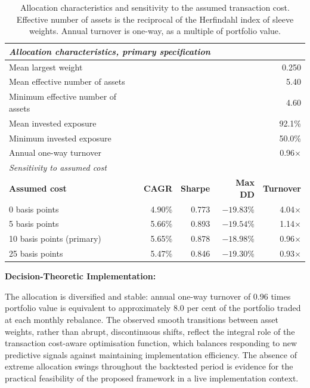 \begin{table}[!ht]
\centering
\caption{Allocation characteristics and sensitivity to the assumed transaction cost.
Effective number of assets is the reciprocal of the Herfindahl index of sleeve weights.
Annual turnover is one-way, as a multiple of portfolio value.}
\label{tab:turnover}
\footnotesize
\begin{tabular}{p{4.8cm}rrrr}
\hline
\multicolumn{5}{l}{\textit{Allocation characteristics, primary specification}} \\
\hline
Mean largest weight & \multicolumn{4}{r}{0.250} \\
Mean effective number of assets & \multicolumn{4}{r}{5.40} \\
Minimum effective number of assets & \multicolumn{4}{r}{4.60} \\
Mean invested exposure & \multicolumn{4}{r}{92.1\%} \\
Minimum invested exposure & \multicolumn{4}{r}{50.0\%} \\
Annual one-way turnover & \multicolumn{4}{r}{0.96$\times$} \\
\hline
\multicolumn{5}{l}{\textit{Sensitivity to assumed cost}} \\
\hline
\textbf{Assumed cost} & \textbf{CAGR} & \textbf{Sharpe} & \textbf{Max DD} & \textbf{Turnover} \\
\hline
0 basis points & 4.90\% & 0.773 & $-19.83$\% & 4.04$\times$ \\
5 basis points & 5.66\% & 0.893 & $-19.54$\% & 1.14$\times$ \\
10 basis points (primary) & 5.65\% & 0.878 & $-18.98$\% & 0.96$\times$ \\
25 basis points & 5.47\% & 0.846 & $-19.30$\% & 0.93$\times$ \\
\hline
\end{tabular}
\end{table}

\textbf{Decision-Theoretic Implementation:}

The allocation is diversified and stable: annual one-way turnover of 0.96 times portfolio
value is equivalent to approximately 8.0 per cent of the portfolio traded at each monthly
rebalance. The observed smooth transitions between asset weights, rather than abrupt,
discontinuous shifts, reflect the integral role of the transaction cost-aware optimisation
function, which balances responding to new predictive signals against maintaining
implementation efficiency. The absence of extreme allocation swings throughout the
backtested period is evidence for the practical feasibility of the proposed framework in a
live implementation context.

